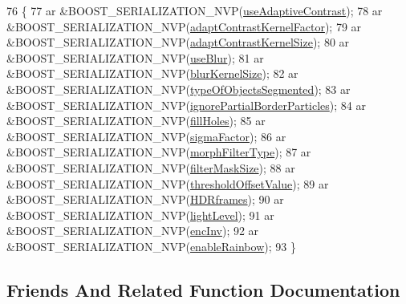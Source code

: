 \begin{DoxyCode}
76                                                           \{
77     ar &BOOST\_SERIALIZATION\_NVP(\hyperlink{class_soil_analyzer_1_1_soil_settings_a0e27335d05aed8f3f084744062368578}{useAdaptiveContrast});
78     ar &BOOST\_SERIALIZATION\_NVP(\hyperlink{class_soil_analyzer_1_1_soil_settings_ace12c0f4bc35d420ef528cc390fc2cdb}{adaptContrastKernelFactor});
79     ar &BOOST\_SERIALIZATION\_NVP(\hyperlink{class_soil_analyzer_1_1_soil_settings_a73f627b092dbdbda37b66ef6c2eef95c}{adaptContrastKernelSize});
80     ar &BOOST\_SERIALIZATION\_NVP(\hyperlink{class_soil_analyzer_1_1_soil_settings_a21bd246a48a712734af86f592030e18b}{useBlur});
81     ar &BOOST\_SERIALIZATION\_NVP(\hyperlink{class_soil_analyzer_1_1_soil_settings_afa46542d30045e00fadbdd5a6ab9a1e1}{blurKernelSize});
82     ar &BOOST\_SERIALIZATION\_NVP(\hyperlink{class_soil_analyzer_1_1_soil_settings_a21ae88dba6b9b0b07d9c26812bc739fb}{typeOfObjectsSegmented});
83     ar &BOOST\_SERIALIZATION\_NVP(\hyperlink{class_soil_analyzer_1_1_soil_settings_a24fb1d7da2247da77a17d853ea1494d7}{ignorePartialBorderParticles});
84     ar &BOOST\_SERIALIZATION\_NVP(\hyperlink{class_soil_analyzer_1_1_soil_settings_a2c9dbe9429742aed1da9d9683da5cc1e}{fillHoles});
85     ar &BOOST\_SERIALIZATION\_NVP(\hyperlink{class_soil_analyzer_1_1_soil_settings_a97e62512e12a2ba9210fd93950b6e717}{sigmaFactor});
86     ar &BOOST\_SERIALIZATION\_NVP(\hyperlink{class_soil_analyzer_1_1_soil_settings_ad1420c4800badb3eb07eba4767e3df81}{morphFilterType});
87     ar &BOOST\_SERIALIZATION\_NVP(\hyperlink{class_soil_analyzer_1_1_soil_settings_ad9d5071bbf6d10638df024e883c6199f}{filterMaskSize});
88     ar &BOOST\_SERIALIZATION\_NVP(\hyperlink{class_soil_analyzer_1_1_soil_settings_a48330eb812672b50a94483f264614e8f}{thresholdOffsetValue});
89     ar &BOOST\_SERIALIZATION\_NVP(\hyperlink{class_soil_analyzer_1_1_soil_settings_a77e631ff44efe74762b5adaa2eb2cd11}{HDRframes});
90     ar &BOOST\_SERIALIZATION\_NVP(\hyperlink{class_soil_analyzer_1_1_soil_settings_aa4d3ed8c1ab6551bfa4763e8a1ffc148}{lightLevel});
91     ar &BOOST\_SERIALIZATION\_NVP(\hyperlink{class_soil_analyzer_1_1_soil_settings_ad831e13b61fc2097219bbf7252f045d5}{encInv});
92     ar &BOOST\_SERIALIZATION\_NVP(\hyperlink{class_soil_analyzer_1_1_soil_settings_a9ece0b96eb8614a497fba3a19d8b4da1}{enableRainbow});
93   \}
\end{DoxyCode}


\subsection{Friends And Related Function Documentation}
\hypertarget{class_soil_analyzer_1_1_soil_settings_ac98d07dd8f7b70e16ccb9a01abf56b9c}{}

